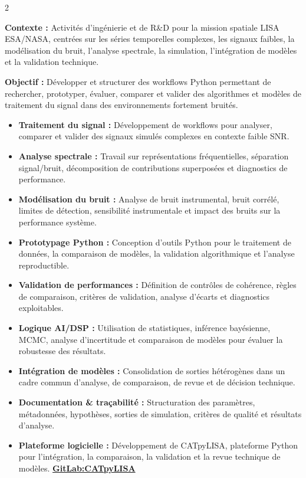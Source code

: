 \documentclass[8pt,a4paper,ragged2e,withhyper]{../_shared/altacv}
\begin{document}
\begin{paracol}{2}
\divider


\textbf{Contexte :} Activités d’ingénierie et de R\&D pour la mission spatiale LISA ESA/NASA, centrées sur les séries temporelles complexes, les signaux faibles, la modélisation du bruit, l’analyse spectrale, la simulation, l’intégration de modèles et la validation technique.

\textbf{Objectif :} Développer et structurer des workflows Python permettant de rechercher, prototyper, évaluer, comparer et valider des algorithmes et modèles de traitement du signal dans des environnements fortement bruités.

\begin{itemize}
  \item \textbf{Traitement du signal :} Développement de workflows pour analyser, comparer et valider des signaux simulés complexes en contexte faible SNR.
  \item \textbf{Analyse spectrale :} Travail sur représentations fréquentielles, séparation signal/bruit, décomposition de contributions superposées et diagnostics de performance.
  \item \textbf{Modélisation du bruit :} Analyse de bruit instrumental, bruit corrélé, limites de détection, sensibilité instrumentale et impact des bruits sur la performance système.
  \item \textbf{Prototypage Python :} Conception d’outils Python pour le traitement de données, la comparaison de modèles, la validation algorithmique et l’analyse reproductible.
  \item \textbf{Validation de performances :} Définition de contrôles de cohérence, règles de comparaison, critères de validation, analyse d’écarts et diagnostics exploitables.
  \item \textbf{Logique AI/DSP :} Utilisation de statistiques, inférence bayésienne, MCMC, analyse d’incertitude et comparaison de modèles pour évaluer la robustesse des résultats.
  \item \textbf{Intégration de modèles :} Consolidation de sorties hétérogènes dans un cadre commun d’analyse, de comparaison, de revue et de décision technique.
  \item \textbf{Documentation \& traçabilité :} Structuration des paramètres, métadonnées, hypothèses, sorties de simulation, critères de qualité et résultats d’analyse.
  \item \textbf{Plateforme logicielle :} Développement de CATpyLISA, plateforme Python pour l’intégration, la comparaison, la validation et la revue technique de modèles.
  \textcolor{DarkPastelRed}{\href{https://gitlab.oca.eu/gboileau/lisa_l3_tools}{\bf GitLab:CATpyLISA}}
\end{itemize}


\end{paracol}
\end{document}
